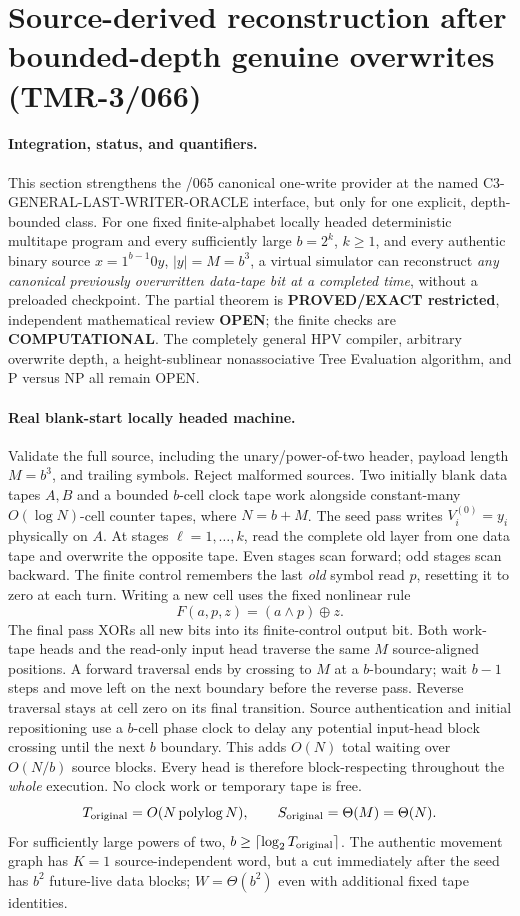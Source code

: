 \documentclass[11pt]{article}
\begin{document}
\section{Source-derived reconstruction after bounded-depth genuine overwrites (TMR-3/066)}
\paragraph{Integration, status, and quantifiers.}
This section strengthens the /065 canonical one-write provider at the
named \textsf{C3-GENERAL-LAST-WRITER-ORACLE} interface, but only for one
explicit, depth-bounded class. For one fixed finite-alphabet
locally headed deterministic multitape program and every sufficiently
large $b=2^k$, $k\ge 1$, and every authentic binary source
$x=1^{b-1}0y$, $|y|=M=b^3$, a virtual simulator can reconstruct
\emph{any canonical previously overwritten data-tape bit at a completed
time}, without a preloaded checkpoint.
The partial theorem is \textbf{PROVED/EXACT restricted}, independent
mathematical review \textbf{OPEN}; the finite checks are
\textbf{COMPUTATIONAL}. The completely general HPV compiler,
arbitrary overwrite depth, a height-sublinear nonassociative
Tree Evaluation algorithm, and P versus NP all remain OPEN.

\paragraph{Real blank-start locally headed machine.}
Validate the full source, including the unary/power-of-two header,
payload length $M=b^3$, and trailing symbols. Reject malformed sources.
Two initially blank data tapes $A,B$ and a bounded $b$-cell clock tape
work alongside constant-many $O(\log N)$-cell counter tapes, where
$N=b+M$. The seed pass writes $V^{(0)}_i=y_i$ physically on $A$.
At stages $\ell=1,\ldots,k$, read the complete old layer from one
data tape and overwrite the opposite tape. Even stages scan forward;
odd stages scan backward. The finite control remembers the last
\emph{old} symbol read $p$, resetting it to zero at each turn.
Writing a new cell uses the fixed nonlinear rule
\[
 F(a,p,z)=(a\land p)\oplus z.
\]
The final pass XORs all new bits into its finite-control output bit.
Both work-tape heads and the read-only input head traverse the
same $M$ source-aligned positions. A forward traversal ends by crossing
to $M$ at a $b$-boundary; wait $b-1$ steps and move left on the next
boundary before the reverse pass. Reverse traversal stays at cell
zero on its final transition. Source authentication and initial
repositioning use a $b$-cell phase clock to delay any potential
input-head block crossing until the next $b$ boundary. This adds
$O(N)$ total waiting over $O(N/b)$ source blocks. Every head is
therefore block-respecting throughout the \emph{whole} execution.
No clock work or temporary tape is free.
\[
 T_{\rm original}=O(N\operatorname{polylog}N),\qquad
 S_{\rm original}=\Theta(M)=\Theta(N).
\]
For sufficiently large powers of two, $b\ge\lceil\log_2T_{\rm original}\rceil$.
The authentic movement graph has $K=1$ source-independent word,
but a cut immediately after the seed has $b^2$ future-live data blocks;
$W=\Theta(b^2)$ even with additional fixed tape identities.
\end{document}
